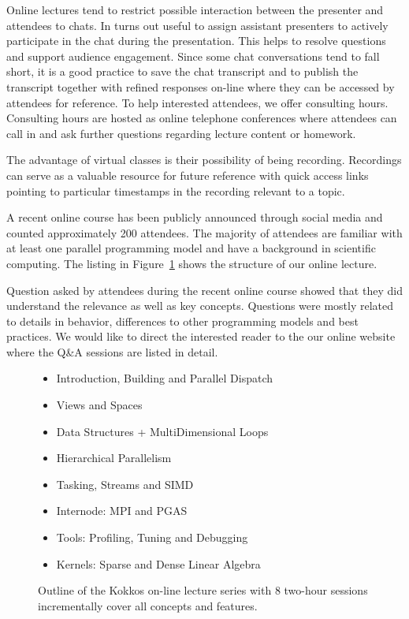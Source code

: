 Online lectures tend to restrict possible interaction between the presenter and attendees to chats. In turns out useful to assign assistant presenters to actively participate in the chat during the presentation. This helps to resolve questions and support audience engagement. Since some chat conversations tend to fall short, it is a good practice to save the chat transcript and to publish the transcript together with refined responses on-line where they can be accessed by attendees for reference. To help interested attendees, we offer consulting hours. Consulting hours are hosted as online telephone conferences where attendees can call in and ask further questions regarding lecture content or homework.

The advantage of virtual classes is their possibility of being recording. Recordings can serve as a valuable resource for future reference with quick access links pointing to particular timestamps in the recording relevant to a topic. 

A recent online course\cite{KOKKOS_LECTURE} has been publicly announced through social media and counted approximately 200 attendees. The majority of attendees are familiar with at least one parallel programming model and have a background in scientific computing. The listing in Figure~\ref{fig:lectureOutline} shows the structure of our online lecture.

Question asked by attendees during the recent online course showed that they did understand the relevance as well as key concepts. Questions were mostly related to details in behavior, differences to other programming models and best practices. We would like to direct the interested reader to the our online website where the Q\&A sessions are listed in detail.

\begin{figure}

\begin{itemize}
\item Introduction, Building and Parallel Dispatch
\item Views and Spaces
\item Data Structures + MultiDimensional Loops
\item Hierarchical Parallelism
\item Tasking, Streams and SIMD
\item Internode: MPI and PGAS
\item Tools: Profiling, Tuning and Debugging
\item Kernels: Sparse and Dense Linear Algebra
\end{itemize}
\caption{Outline of the Kokkos on-line lecture series with 8 two-hour sessions incrementally cover all concepts and features.}
\label{fig:lectureOutline}
\end{figure}




